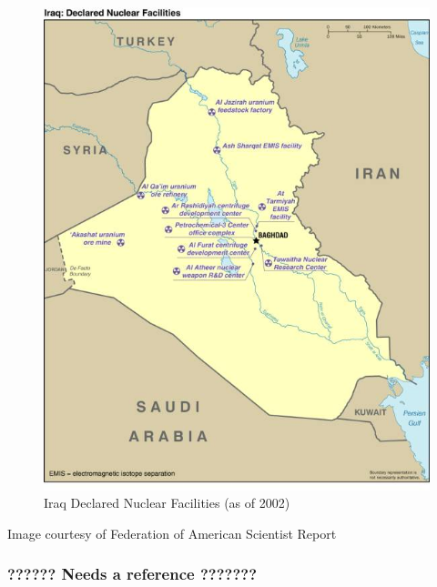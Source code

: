 \documentclass{report}
\begin{document}
\begin{figure}[H]
 \centering
 \includegraphics[trim = 0cm 0cm 0cm 0cm, clip,scale=.6]{./figures/nuke_facilities.jpg}
   \caption{Iraq Declared Nuclear Facilities (as of 2002)}
     \label{fig:nuke_facilities}
\end{figure}





Image courtesy of Federation of American Scientist Report



\subsubsection{??????  Needs a reference   ???????}
\end{document}
